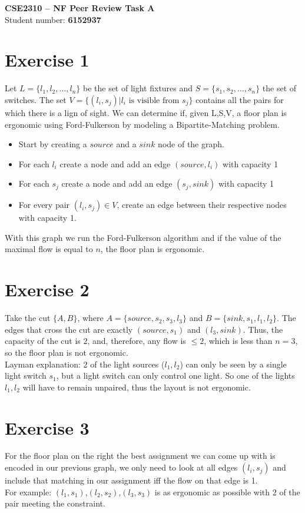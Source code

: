 \documentclass[a4paper,11pt]{article}
\begin{document}
	\begin{center}
		{\Large \textbf{CSE2310 – NF Peer Review Task A}}\\[4pt]
		Student number: \textbf{6152937}
	\end{center}

	\vspace{1em}

	\section{Exercise 1}
	Let $L=\{l_1,l_2,\dots,l_n\}$ be the set of light fixtures and $S=\{s_1,s_2,\dots,s_n\}$ the set of switches. The set $V=\{(l_i,s_j) | l_i\text{ is visible from } s_j\}$ contains all the pairs for which there is a lign of sight. We can determine if, given L,S,V, a floor plan is ergonomic using Ford-Fulkerson by modeling a Bipartite-Matching problem.
	\begin{itemize}
		\item Start by creating a $source$ and a $sink$ node of the graph.
		\item For each $l_i$ create a node and add an edge $(source, l_i)$ with capacity 1
		\item For each $s_j$ create a node and add an edge $(s_j, sink)$ with capacity 1
		\item For every pair $(l_i,s_j)\in V$, create an edge between their respective nodes with capacity 1.
	\end{itemize}
	With this graph we run the Ford-Fulkerson algorithm and if the value of the maximal flow is equal to $n$, the floor plan is ergonomic.

	\section{Exercise 2}
	Take the cut $\{A,B\}$, where $A=\{source,s_2,s_3,l_3\}$ and $B=\{sink,s_1,l_1,l_2\}$. The edges that cross the cut are exactly $(source,s_1)$ and $(l_3,sink)$. Thus, the capacity of the cut is $2$, and, therefore, any flow is $\le2$, which is less than $n=3$, so the floor plan is not ergonomic.\\
	Layman explanation: 2 of the light sources ($l_1,l_2$) can only be seen by a single light switch $s_1$, but a light switch can only control one light. So one of the lights $l_1,l_2$ will have to remain unpaired, thus the layout is not ergonomic.

	\section{Exercise 3}
	For the floor plan on the right the best assignment we can come up with is encoded in our previous graph, we only need to look at all edges $(l_i,s_j)$ and include that matching in our assignment iff the flow on that edge is 1.\\
	For example: $(l_1,s_1)$,$(l_2,s_2)$,$(l_3,s_3)$ is as ergonomic as possible with 2 of the pair meeting the constraint.
\end{document}
